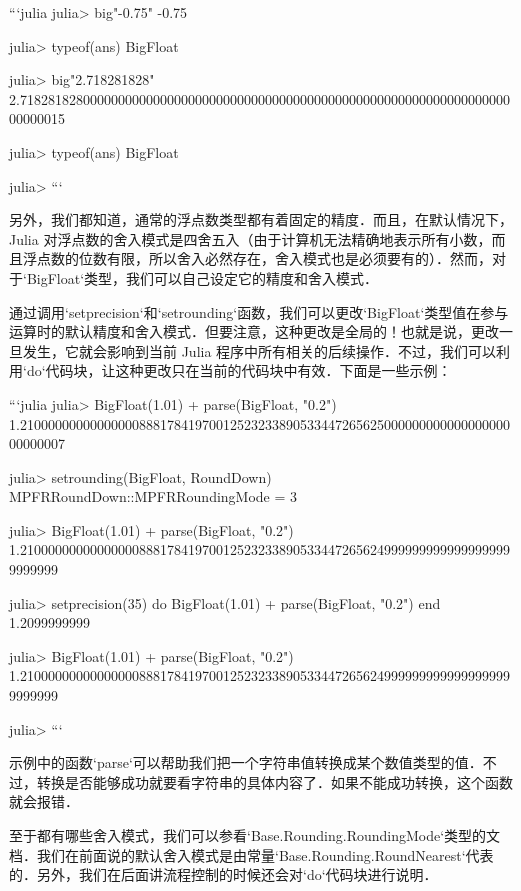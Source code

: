 ```julia
julia> big"-0.75"
-0.75

julia> typeof(ans)
BigFloat

julia> big"2.718281828"
2.718281828000000000000000000000000000000000000000000000000000000000000000000015

julia> typeof(ans)
BigFloat

julia> 
```

另外，我们都知道，通常的浮点数类型都有着固定的精度．而且，在默认情况下，Julia 对浮点数的舍入模式是四舍五入（由于计算机无法精确地表示所有小数，而且浮点数的位数有限，所以舍入必然存在，舍入模式也是必须要有的）．然而，对于`BigFloat`类型，我们可以自己设定它的精度和舍入模式．

通过调用`setprecision`和`setrounding`函数，我们可以更改`BigFloat`类型值在参与运算时的默认精度和舍入模式．但要注意，这种更改是全局的！也就是说，更改一旦发生，它就会影响到当前 Julia 程序中所有相关的后续操作．不过，我们可以利用`do`代码块，让这种更改只在当前的代码块中有效．下面是一些示例：

```julia
julia> BigFloat(1.01) + parse(BigFloat, "0.2")
1.210000000000000008881784197001252323389053344726562500000000000000000000000007

julia> setrounding(BigFloat, RoundDown)
MPFRRoundDown::MPFRRoundingMode = 3

julia> BigFloat(1.01) + parse(BigFloat, "0.2")
1.21000000000000000888178419700125232338905334472656249999999999999999999999999

julia> setprecision(35) do 
           BigFloat(1.01) + parse(BigFloat, "0.2") 
       end
1.2099999999

julia> BigFloat(1.01) + parse(BigFloat, "0.2") 
1.21000000000000000888178419700125232338905334472656249999999999999999999999999

julia> 
```

示例中的函数`parse`可以帮助我们把一个字符串值转换成某个数值类型的值．不过，转换是否能够成功就要看字符串的具体内容了．如果不能成功转换，这个函数就会报错．

至于都有哪些舍入模式，我们可以参看`Base.Rounding.RoundingMode`类型的文档．我们在前面说的默认舍入模式是由常量`Base.Rounding.RoundNearest`代表的．另外，我们在后面讲流程控制的时候还会对`do`代码块进行说明．